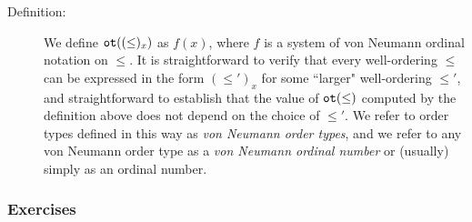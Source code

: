 \documentclass[12pt]{book}
\begin{document}
\begin{description}
\item[Definition:]  We define ${\tt ot}((\leq)_x)$ as $f(x)$, where $f$ is a system of von Neumann ordinal notation on $\leq$.  It is straightforward to verify that every well-ordering
$\leq$ can be expressed in the form $(\leq')_x$ for some ``larger" well-ordering $\leq'$, and straightforward to establish that the value of ${\tt ot}(\leq)$ computed by the definition above does not depend on the choice of $\leq'$.  We refer to order types defined in this way as {\em von Neumann order types\/}, and we refer to any von Neumann order type as a {\em von Neumann ordinal number\/} or (usually) simply as an ordinal number.

\end{description}

\subsubsection{Exercises}
\end{document}

